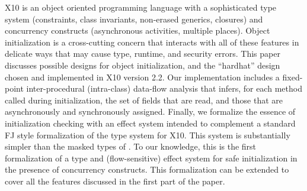 X10 is an object oriented programming language with a sophisticated
    type system (constraints, class invariants, non-erased generics, closures)
    and concurrency constructs (asynchronous activities, multiple places).
Object initialization is a cross-cutting concern that interacts with all of these features
    in delicate ways that may cause type, runtime, and security errors.
This paper discusses possible designs for object initialization,
    and the ``hardhat'' design chosen and implemented in X10 version 2.2.
Our implementation includes a
    fixed-point inter-procedural (intra-class)
    data-flow analysis
    that infers, for each method called during initialization,
    the set of fields that are read, and
    those that are asynchronously and synchronously assigned.
Finally, we formalize the essence of initialization checking with an
effect system intended to complement a standard FJ style
formalization of the type system for X10. This system is substantially
simpler than the masked types of \cite{XinQi:2009}. To our knowledge, this is
the first formalization of a type and (flow-sensitive) effect system
for safe initialization in the presence of concurrency
constructs. This formalization can be extended to cover all the
features discussed in the first part of the paper.
